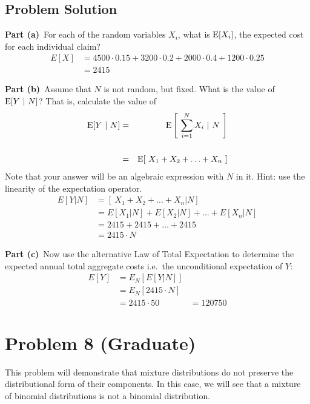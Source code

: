 \documentclass[12pt]{article}
\theoremstyle{definition}
\begin{document}
\subsection*{Problem Solution}

\bigskip
\noindent
{\bf Part (a)}\ For each of the random variables $X_i$, what is $\hbox{E}[X_i]$, the expected cost for each individual claim?
\begin{align*}
E[X] &= 4500 \cdot 0.15 + 3200 \cdot 0.2 + 2000 \cdot 0.4 + 1200 \cdot 0.25\\
&= 2415
\end{align*}

\newpage
\noindent
{\bf Part (b)}\ Assume that $N$ is not random, but fixed. What is the value of $\hbox{E}[Y\ |\ N]$? That is, calculate the value of 
\begin{eqnarray*}
	\hbox{E}[ Y\ |\ N] & = & \hbox{E} \left [\ \sum_{i=1}^N X_i\ |\ N\ \right ]\\
	\\
	& = & \hbox{E}[\ X_1 + X_2 + \ldots + X_n\ ]
\end{eqnarray*}
Note that your answer will be an algebraic expression with $N$ in it. Hint: use the linearity of the expectation operator.
\begin{align*}
E[Y|N] &= [\ X_1 + X_2 + \ldots + X_n |N]\\
&= E[X_1|N] + E[X_2|N] +\ldots + E[X_n|N]\\
&= 2415 + 2415 +\ldots + 2415\\
&= 2415\cdot N
\end{align*}

\noindent
{\bf Part (c)}\ Now use the alternative Law of Total Expectation to determine the expected annual total aggregate costs i.e.\ the unconditional expectation of $Y$:
\begin{align*}
E[Y] &= E_N[E[Y|N]]\\
&= E_N[2415\cdot N]\\
&= 2415\cdot 50
&= 120750
\end{align*}

\newpage
\section*{Problem 8 (Graduate)}

This problem will demonstrate that mixture distributions do not preserve the distributional form of their components. In this case, we will see that a mixture of binomial distributions is not a binomial distribution.
\end{document}
